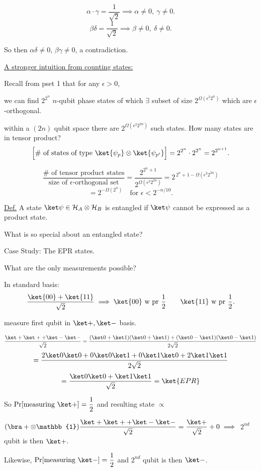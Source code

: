 \documentclass[11pt]{article}
\begin{document}
\[
\alpha\cdot\gamma = \frac1{\sqrt2} \implies \alpha\neq0,\ \gamma\neq0.
\]
\[
\beta\delta = \frac1{\sqrt2} \implies \beta\neq0,\ \delta\neq0.
\]

So then $\alpha\delta\neq0$, $\beta\gamma\neq0$, a contradiction.

\underline{A stronger intuition from counting states:}

Recall from pset 1 that for any $\epsilon>0$,

we can find $2^{2^n}$ $n$-qubit phase states of which $\exists$ subset of size $2^{\Omega(\epsilon^2 2^n)}$ which are $\epsilon$-orthogonal.

within a $(2n)$ qubit space there are $2^{\Omega(\epsilon^2 2^{2n})}$ such states. How many states are in tensor product?
\[
\Big[\#\text{ of states of type } \ket{\psi_p}\otimes\ket{\psi_{p'}}\Big] = 2^{2^n}\cdot 2^{2^n} = 2^{2^{n+1}}.
\]

\[
\frac{\#\text{ of tensor product states}}{\text{size of } \epsilon\text{-orthogonal set}} = \frac{2^{2^n+1}}{2^{\Omega(\epsilon^2 2^{2n})}} = 2^{\,2^n+1-\Omega(\epsilon^2 2^{2n})}
\]
\[
= 2^{-\Omega(2^n)} \quad \text{for } \epsilon < 2^{-n/10}.
\]

\underline{Def.} A state $\ket\psi \in \mathcal{H}_A\otimes\mathcal{H}_B$ is entangled if $\ket\psi$ cannot be expressed as a product state.

What is so special about an entangled state?

Case Study: The EPR states.

What are the only measurements possible?

In standard basis:
\[
\frac{\ket{00}+\ket{11}}{\sqrt2} \implies \ket{00} \text{ w pr } \frac12 \qquad \ket{11} \text{ w pr } \frac12.
\]

measure first qubit in $\ket+,\ket-$ basis.

\[
\frac{\ket+\ket+ + \ket-\ket-}{\sqrt2} = \frac{(\ket0+\ket1)(\ket0+\ket1) + (\ket0-\ket1)(\ket0-\ket1)}{2\sqrt2}
\]
\[
= \frac{2\ket0\ket0 + 0\ket0\ket1 + 0\ket1\ket0 + 2\ket1\ket1}{2\sqrt2}
\]
\[
= \frac{\ket0\ket0 + \ket1\ket1}{\sqrt2} = \ket{EPR}
\]

So $\Pr[\text{measuring }\ket+] = \dfrac12$ and resulting state $\propto$

$(\bra+\otimes\mathbb{1})\dfrac{\ket+\ket++\ket-\ket-}{\sqrt2} = \dfrac{\ket+}{\sqrt2} + 0 \implies$ $2^{nd}$ qubit is then $\ket+$.

Likewise, $\Pr[\text{measuring }\ket-] = \dfrac12$ and $2^{nd}$ qubit is then $\ket-$.
\end{document}
